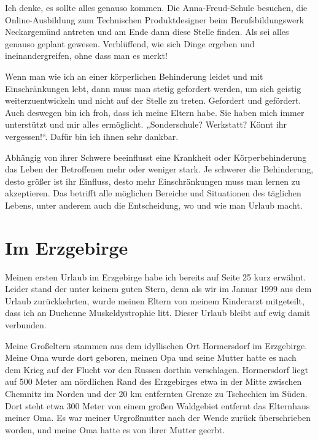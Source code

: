 \documentclass[fontsize=14pt,a4paper,headinclude,DIV=calc,automark]{scrbook}
\begin{document}
Ich denke, es sollte alles genauso kommen. Die Anna-Freud-Schule besuchen, die Online-Ausbildung zum Technischen Produktdesigner beim Be\-rufs\-bil­d\-ungs\-werk Neckargemünd antreten und am Ende dann diese Stelle finden. Als sei alles genauso geplant gewesen. Verblüffend, wie sich Dinge ergeben und ineinandergreifen, ohne dass man es merkt!

Wenn man wie ich an einer körperlichen Behinderung leidet und mit Einschränkungen lebt, dann muss man stetig gefordert werden, um sich geistig weiterzuentwickeln und nicht auf der Stelle zu treten. Gefordert und gefördert. Auch deswegen bin ich froh, dass ich meine Eltern habe. Sie haben mich immer unterstützt und mir alles ermöglicht. „Sonderschule? Werkstatt? Könnt ihr vergessen!“. Dafür bin ich ihnen sehr dankbar.

\thispagestyle{scrheadings} %

\leavevmode
\normalsize

Abhängig von ihrer Schwere beeinflusst eine Krankheit oder Körperbehinderung das Leben der Betroffenen mehr oder weniger stark. Je schwerer die Behinderung, desto größer ist ihr Einfluss, desto mehr Einschränkungen muss man lernen zu akzeptieren. Das betrifft alle möglichen Bereiche und Situationen des täglichen Lebens, unter anderem auch die Entscheidung, wo und wie man Urlaub macht.

\section{Im Erzgebirge}

Meinen ersten Urlaub im Erzgebirge habe ich bereits auf Seite 25 kurz erwähnt. Leider stand der unter keinem guten Stern, denn als wir im Januar 1999 aus dem Urlaub zurückkehrten, wurde meinen Eltern von meinem Kinderarzt mitgeteilt, dass ich an Duchenne Muskeldystrophie litt. Dieser Urlaub bleibt auf ewig damit verbunden.

Meine Großeltern stammen aus dem idyllischen Ort Hormersdorf im Erzgebirge. Meine Oma wurde dort geboren, meinen Opa und seine Mutter hatte es nach dem Krieg auf der Flucht vor den Russen dorthin verschlagen. Hormersdorf liegt auf 500 Meter am nördlichen Rand des Erzgebirges etwa in der Mitte zwischen Chemnitz im Norden und der 20 km entfernten Grenze zu Tschechien im Süden. Dort steht etwa 300 Meter von einem großen Waldgebiet entfernt das Elternhaus meiner Oma. Es war meiner Urgroßmutter nach der Wende zurück überschrieben worden, und meine Oma hatte es von ihrer Mutter geerbt.
\end{document}
